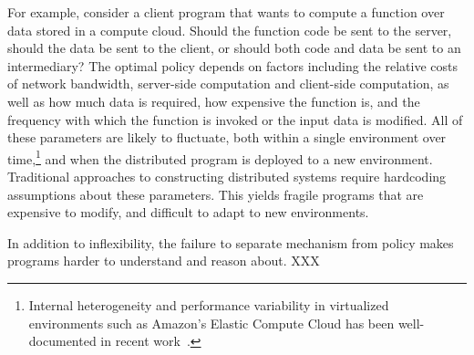 \documentclass{article}
\begin{document}
For example, consider a client program that wants to compute a
function over data stored in a compute cloud. Should the function code
be sent to the server, should the data be sent to the client, or
should both code and data be sent to an intermediary? The optimal
policy depends on factors including the relative costs of network
bandwidth, server-side computation and client-side computation, as
well as how much data is required, how expensive the function is, and
the frequency with which the function is invoked or the input data is
modified. All of these parameters are likely to fluctuate, both within
a single environment over time,\footnote{Internal heterogeneity and
  performance variability in virtualized environments such as Amazon's
  Elastic Compute Cloud has been well-documented in recent
  work~\cite{late-sched}.} and when the distributed program is
deployed to a new environment. Traditional approaches to constructing
distributed systems require hardcoding assumptions about these
parameters. This yields fragile programs that are expensive to modify,
and difficult to adapt to new environments.

In addition to inflexibility, the failure to separate mechanism from
policy makes programs harder to understand and reason about. XXX
\end{document}
